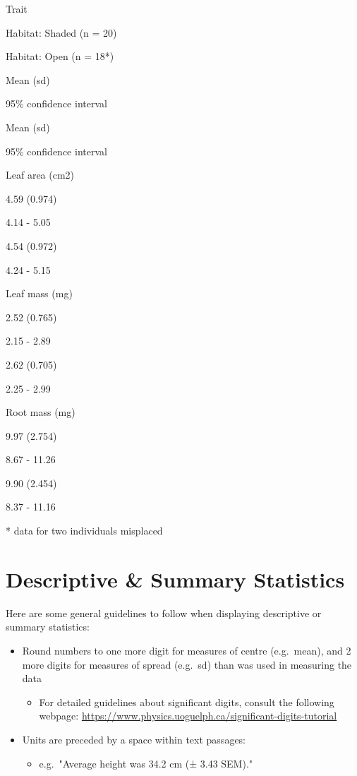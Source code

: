 \documentclass[
]{book}
\providecommand{\tightlist}{%
  \setlength{\itemsep}{0pt}\setlength{\parskip}{0pt}}
\begin{document}
Trait

Habitat: Shaded (n = 20)

Habitat: Open (n = 18*)

Mean (sd)

95\% confidence interval

Mean (sd)

95\% confidence interval

Leaf area (cm2)

4.59 (0.974)

4.14 - 5.05

4.54 (0.972)

4.24 - 5.15

Leaf mass (mg)

2.52 (0.765)

2.15 - 2.89

2.62 (0.705)

2.25 - 2.99

Root mass (mg)

9.97 (2.754)

8.67 - 11.26

9.90 (2.454)

8.37 - 11.16

* data for two individuals misplaced

\hypertarget{descriptive-summary-statistics}{%
\section{Descriptive \& Summary Statistics}\label{descriptive-summary-statistics}}

Here are some general guidelines to follow when displaying descriptive or summary statistics:

\begin{itemize}
\tightlist
\item
  Round numbers to one more digit for measures of centre (e.g.~mean), and 2 more digits for measures of spread (e.g.~sd) than was used in measuring the data

  \begin{itemize}
  \tightlist
  \item
    For detailed guidelines about significant digits, consult the following webpage: \url{https://www.physics.uoguelph.ca/significant-digits-tutorial}
  \end{itemize}
\item
  Units are preceded by a space within text passages:

  \begin{itemize}
  \tightlist
  \item
    e.g.~"Average height was 34.2 cm (± 3.43 SEM)."
  \end{itemize}
\end{itemize}
\end{document}
